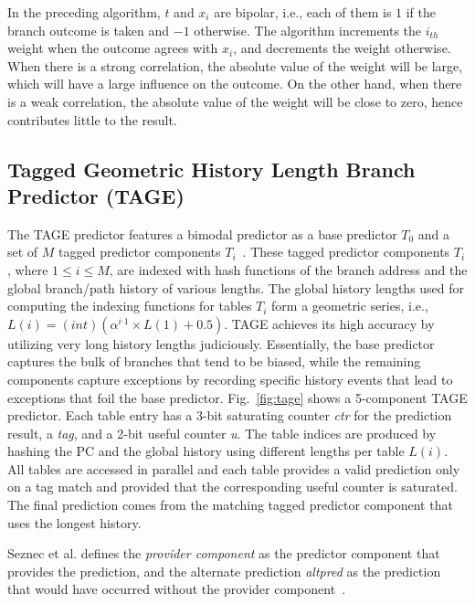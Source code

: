 In the preceding algorithm, $t$ and $x_i$ are bipolar, i.e., each of them is $1$ if the branch outcome is taken and $-1$ otherwise. The algorithm increments the $i_{th}$ weight when the outcome agrees with $x_i$, and decrements the weight otherwise. When there is a strong correlation, the absolute value of the weight will be large, which will have a large influence on the outcome. On the other hand, when there is a weak correlation, the absolute value of the weight will be close to zero, hence contributes little to the result.


\subsection{Tagged Geometric History Length Branch Predictor (TAGE)}
\label{sec:background:dirpred:tage}
The TAGE predictor features a bimodal predictor as a base predictor $T_0$ and a set of $M$ tagged predictor components $T_i$~\cite{tage}. These tagged predictor components $T_i$, where $1\leq i\leq M$, are indexed with hash functions of the branch address and the global branch/path history of various lengths. The global history lengths used for computing the indexing functions for tables $T_i$ form a geometric series, i.e., $L(i) = (int)(\alpha^{i{}^{\_}1}\times L(1)+0.5)$. TAGE achieves its high accuracy by utilizing very long history lengths judiciously.
Essentially, the base predictor captures the bulk of branches that tend to be biased, while the remaining components capture exceptions by recording specific history events that lead to exceptions that foil the base predictor.
Fig.~\ref{fig:tage} shows a 5-component TAGE predictor. Each table entry has a 3-bit saturating counter \textit{ctr} for the prediction result, a \textit{tag}, and a 2-bit useful counter \textit{u}. The table indices are produced by hashing the PC and the global history using different lengths per table $L(i)$. All tables are accessed in parallel and each table provides a valid prediction only on a tag match and provided that the corresponding useful counter is saturated. The final prediction comes from the matching tagged predictor component that uses the longest history.

Seznec et al. defines the \textit{provider component} as the predictor component that provides the prediction, and the alternate prediction \textit{altpred} as the prediction that would have occurred without the provider component~\cite{tage}.

